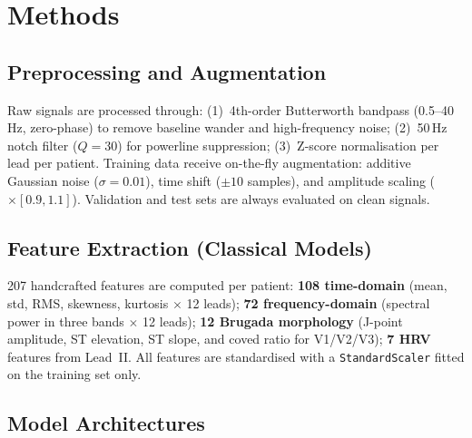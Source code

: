 \documentclass[journal, 10pt, twoside]{IEEEtran}
\begin{document}
\section{Methods}
\label{sec:methods}

\subsection{Preprocessing and Augmentation}

Raw signals are processed through: (1)~4th-order Butterworth bandpass
(0.5--40\,Hz, zero-phase) to remove baseline wander and high-frequency
noise; (2)~50\,Hz notch filter ($Q=30$) for powerline suppression;
(3)~Z-score normalisation per lead per patient.
Training data receive on-the-fly augmentation: additive Gaussian noise
($\sigma=0.01$), time shift ($\pm10$ samples), and amplitude scaling
($\times[0.9,1.1]$).
Validation and test sets are always evaluated on clean signals.

\subsection{Feature Extraction (Classical Models)}

207 handcrafted features are computed per patient:
\textbf{108 time-domain} (mean, std, RMS, skewness, kurtosis
$\times$ 12 leads);
\textbf{72 frequency-domain} (spectral power in three bands
$\times$ 12 leads);
\textbf{12 Brugada morphology} (J-point amplitude, ST elevation, ST slope,
and coved ratio for V1/V2/V3);
\textbf{7 HRV} features from Lead~II.
All features are standardised with a \texttt{StandardScaler} fitted
on the training set only.

\subsection{Model Architectures}
\end{document}
